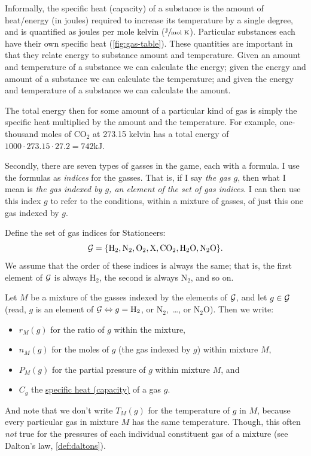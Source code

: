 \documentclass{article}
\newcommand{\Hyd}{\mathrm{H}_2}
\newcommand{\Nit}{\mathrm{N}_2}
\newcommand{\Ox}{\mathrm{O}_2}
\newcommand{\Pol}{\mathrm{X}}
\newcommand{\CDiox}{\mathrm{CO}_2}
\newcommand{\Water}{\mathrm{H}_2\mathrm{O}}
\newcommand{\NiOx}{\mathrm{N}_2\mathrm{O}}
\begin{document}
\begin{definition*}
    Informally, the specific heat (capacity) of a substance is the amount of heat/energy (in joules)
    required to increase its temperature by a single degree, and is quantified as joules per mole
    kelvin ($\sfrac{\text{J}}{\text{mol K}}$). Particular substances each have their
    own specific heat (\cref{fig:gas-table}). These quantities are important in that they relate
    energy to substance amount and temperature. Given an amount and temperature of a substance we
    can calculate the energy; given the energy and amount of a substance we can calculate the
    temperature; and given the energy and temperature of a substance we can calculate the amount.

    The total energy then for some amount of a particular kind of gas is simply the specific heat
    multiplied by the amount and the temperature. For example, one-thousand moles of $\CDiox$ at
    273.15 kelvin has a total energy of $1000\cdot 273.15\cdot 27.2=742\text{kJ}$.
\end{definition*}
Secondly, there are seven types of gasses in the game, each with a formula. I use the formulas as
\emph{indices} for the gasses. That is, if I say \emph{the gas $g$}, then what I mean is \emph{the
gas indexed by $g$, an element of the set of gas indices}. I can then use this index $g$ to refer to
the conditions, within a mixture of gasses, of just this one gas indexed by $g$.
\begin{definition}
    Define the set of gas indices for Stationeers:
    \[
        \calG = \{\Hyd,\Nit,\Ox,\Pol,\CDiox,\Water,\NiOx\}.
    \]
    We assume that the order of these indices is always the same;
    that is, the first element of $\operatorname{{\mathcal{G}}}$ is always $\Hyd$, the second is always $\Nit$, and so on.

    Let $M$ be a mixture of the gasses indexed by the elements of $\operatorname{{\mathcal{G}}}$, and
    let $g\in\operatorname{{\mathcal{G}}}$ (read, $g$ is an element of $\calG\Leftrightarrow g=\Hyd$, or $\Nit$,\ \ldots, or $\NiOx$).
    Then we write:
    \begin{itemize}
        \item $r_M(g)$ for the ratio of $g$ within the mixture,
        \item $n_M(g)$ for the moles of $g$ (the gas indexed by $g$) within mixture $M$,
        \item $P_M(g)$ for the partial pressure of $g$ within mixture $M$, and
        \item $C_g$ the \href{https://en.wikipedia.org/wiki/Specific_heat_capacity}{specific heat
            (capacity)} of a gas $g$.
    \end{itemize}
    And note that we don't write $T_M(g)$ for the temperature of $g$ in $M$, because every
    particular gas in mixture $M$ has the same temperature. Though, this often \emph{not} true for
    the pressures of each individual constituent gas of a mixture (see Dalton's law,
    \cref{def:daltons}).
\end{definition}
\end{document}

